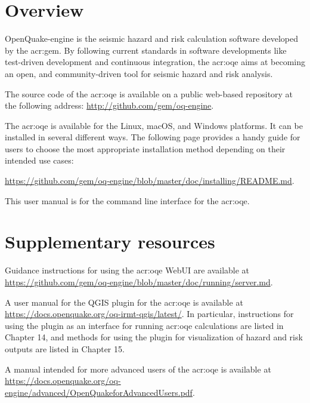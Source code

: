 \section{Overview}

OpenQuake-engine is the seismic hazard and risk calculation software developed by
the \glsdesc{acr:gem}. By following current standards in software
developments like test-driven development and continuous integration, the
\glsdesc{acr:oqe} aims at becoming an open, and community-driven tool for
seismic hazard and risk analysis.

The source code of the \glsdesc{acr:oqe} is available on a public web-based
repository at the following address:
\href{http://github.com/gem/oq-engine}{http://github.com/gem/oq-engine}.

The \glsdesc{acr:oqe} is available for the Linux, macOS, and Windows
platforms. It can be installed in several different ways. The following page
provides a handy guide for users to choose the most appropriate installation
method depending on their intended use cases:

\href{https://github.com/gem/oq-engine/blob/master/doc/installing/README.md}{https://github.com/gem/oq-engine/blob/master/doc/installing/README.md}.

This user manual is for the command line interface for the \glsdesc{acr:oqe}.


\section{Supplementary resources}

Guidance instructions for using the \glsdesc{acr:oqe} WebUI are available 
at \href{https://github.com/gem/oq-engine/blob/master/doc/running/server.md}{https://github.com/gem/oq-engine/blob/master/doc/running/server.md}.

A user manual for the QGIS plugin for the \glsdesc{acr:oqe} is available at 
\href{https://docs.openquake.org/oq-irmt-qgis/latest/}{https://docs.openquake.org/oq-irmt-qgis/latest/}. 
In particular, instructions for using the plugin as an interface for running \glsdesc{acr:oqe}
calculations are listed in Chapter 14, and methods for using the plugin for visualization 
of hazard and risk outputs are listed in Chapter 15.

A manual intended for more advanced users of the \glsdesc{acr:oqe} is available
at \href{https://docs.openquake.org/oq-engine/advanced/OpenQuakeforAdvancedUsers.pdf}{https://docs.openquake.org/oq-engine/advanced/OpenQuakeforAdvancedUsers.pdf}.


